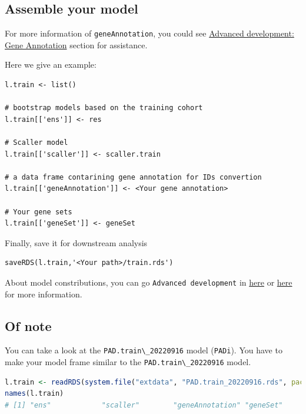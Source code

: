 \documentclass[
  12pt,
]{book}
\newcommand{\passthrough}[1]{#1}
\begin{document}
\hypertarget{assemble-your-model}{%
\subsection{Assemble your model}\label{assemble-your-model}}

For more information of \passthrough{\lstinline!geneAnnotation!}, you could see \href{https://github.com/huangwb8/GSClassifier/wiki/Advanced-development\#Gene-Annotation}{Advanced development: Gene Annotation} section for assistance.

Here we give an example:

\begin{lstlisting}
l.train <- list()

# bootstrap models based on the training cohort
l.train[['ens']] <- res 

# Scaller model
l.train[['scaller']] <- scaller.train 

# a data frame contarining gene annotation for IDs convertion
l.train[['geneAnnotation']] <- <Your gene annotation>

# Your gene sets
l.train[['geneSet']] <- geneSet
\end{lstlisting}

Finally, save it for downstream analysis

\begin{lstlisting}
saveRDS(l.train,'<Your path>/train.rds')
\end{lstlisting}

About model constributions, you can go \passthrough{\lstinline!Advanced development!} in \href{https://github.com/huangwb8/GSClassifier/wiki/Advanced-development}{here} or \href{http://htmlpreview.github.io/?https://raw.githubusercontent.com/wiki/huangwb8/GSClassifier/Advanced-development.html}{here} for more information.

\hypertarget{of-note-2}{%
\subsection{Of note}\label{of-note-2}}

You can take a look at the \passthrough{\lstinline!PAD.train\_20220916!} model (\passthrough{\lstinline!PADi!}). You have to make your model frame similar to the \passthrough{\lstinline!PAD.train\_20220916!} model.

\begin{lstlisting}[language=R]
l.train <- readRDS(system.file("extdata", "PAD.train_20220916.rds", package = "GSClassifier"))
names(l.train)
# [1] "ens"            "scaller"        "geneAnnotation" "geneSet"
\end{lstlisting}
\end{document}
